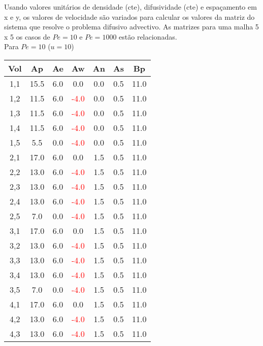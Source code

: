 \documentclass[]{article}
\begin{document}
Usando valores unitários de densidade (cte), difusividade (cte) e espaçamento em x e y, os valores de velocidade são variados para calcular os valores da matriz do sistema que resolve o problema difusivo advectivo. As matrizes para uma malha 5 x 5 os casos de $ Pe = 10 $ e $ Pe = 1000$ estão relacionadas.\\

Para $ Pe = 10 $ ($u = 10$)

\begin{table}[H]
	\centering
	\begin{tabular}{|c|c|c|c|c|c|c|}
		\hline
		\textbf{Vol} & \textbf{Ap} & \textbf{Ae} & \textbf{Aw} & \textbf{An} & \textbf{As} & \textbf{Bp} \\
		\hline
		1,1  & 15.5 & 6.0  & 0.0  & 0.0  & 0.5  & 11.0 \\
		1,2  & 11.5 & 6.0  & \textcolor{red}{-4.0} & 0.0  & 0.5  & 11.0 \\
		1,3  & 11.5 & 6.0  & \textcolor{red}{-4.0} & 0.0  & 0.5  & 11.0 \\
		1,4  & 11.5 & 6.0  & \textcolor{red}{-4.0} & 0.0  & 0.5  & 11.0 \\
		1,5  & 5.5  & 0.0  & \textcolor{red}{-4.0} & 0.0  & 0.5  & 11.0 \\
		2,1  & 17.0 & 6.0  & 0.0  & 1.5  & 0.5  & 11.0 \\
		2,2  & 13.0 & 6.0  & \textcolor{red}{-4.0} & 1.5  & 0.5  & 11.0 \\
		2,3  & 13.0 & 6.0  & \textcolor{red}{-4.0} & 1.5  & 0.5  & 11.0 \\
		2,4  & 13.0 & 6.0  & \textcolor{red}{-4.0} & 1.5  & 0.5  & 11.0 \\
		2,5  & 7.0  & 0.0  & \textcolor{red}{-4.0} & 1.5  & 0.5  & 11.0 \\
		3,1  & 17.0 & 6.0  & 0.0  & 1.5  & 0.5  & 11.0 \\
		3,2  & 13.0 & 6.0  & \textcolor{red}{-4.0} & 1.5  & 0.5  & 11.0 \\
		3,3  & 13.0 & 6.0  & \textcolor{red}{-4.0} & 1.5  & 0.5  & 11.0 \\
		3,4  & 13.0 & 6.0  & \textcolor{red}{-4.0} & 1.5  & 0.5  & 11.0 \\
		3,5  & 7.0  & 0.0  & \textcolor{red}{-4.0} & 1.5  & 0.5  & 11.0 \\
		4,1  & 17.0 & 6.0  & 0.0  & 1.5  & 0.5  & 11.0 \\
		4,2  & 13.0 & 6.0  & \textcolor{red}{-4.0} & 1.5  & 0.5  & 11.0 \\
		4,3  & 13.0 & 6.0  & \textcolor{red}{-4.0} & 1.5  & 0.5  & 11.0 \\

\end{tabular}
\end{table}
\end{document}

